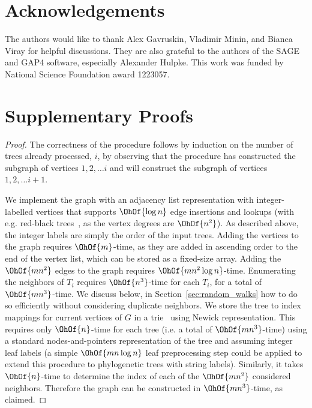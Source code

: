 \documentclass[11pt]{amsart}
\begin{document}
\section{Acknowledgements}
The authors would like to thank Alex Gavruskin, Vladimir Minin, and Bianca Viray for helpful discussions.
They are also grateful to the authors of the SAGE and GAP4 software, especially Alexander Hulpke.
This work was funded by National Science Foundation award 1223057.

\pagebreak




\pagebreak

\appendix

\section{Supplementary Proofs}

\constructgraph*
\begin{proof}
	The correctness of the procedure follows by induction on the number of trees already processed, $i$, by observing that the procedure has constructed the subgraph of vertices $1, 2,  \ldots i$ and will construct the subgraph of vertices $1, 2, \ldots i+1$.

	We implement the graph with an adjacency list representation with integer-labelled vertices that supports $\OhOf{\log n}$ edge insertions and lookups (with e.g. red-black trees~\cite{guibas1978dichromatic}, as the vertex degrees are $\OhOf{n^2}$).
	As described above, the integer labels are simply the order of the input trees.
	Adding the vertices to the graph requires $\OhOf{m}$-time, as they are added in ascending order to the end of the vertex list, which can be stored as a fixed-size array.
	Adding the $\OhOf{mn^2}$ edges to the graph requires $\OhOf{mn^2 \log n}$-time.
	Enumerating the neighbors of $T_i$ requires $\OhOf{n^3}$-time for each $T_i$, for a total of $\OhOf{mn^3}$-time.
	We discuss below, in Section~\ref{sec:random_walks} how to do so efficiently without considering duplicate neighbors.
	We store the tree to index mappings for current vertices of $G$ in a trie~\cite{fredkin1960trie} using Newick representation.
	This requires only $\OhOf{n}$-time for each tree (i.e. a total of $\OhOf{mn^3}$-time) using a standard nodes-and-pointers representation of the tree and assuming integer leaf labels (a simple $\OhOf{mn\log n}$ leaf preprocessing step could be applied to extend this procedure to phylogenetic trees with string labels).
	Similarly, it takes $\OhOf{n}$-time to determine the index of each of the $\OhOf{mn^2}$ considered neighbors.
	Therefore the graph can be constructed in $\OhOf{mn^3}$-time, as claimed.
\end{proof}
\end{document}
